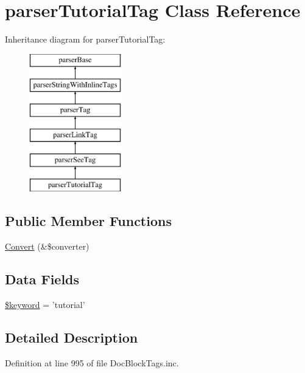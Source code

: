 \hypertarget{classparser_tutorial_tag}{\section{parser\-Tutorial\-Tag \-Class \-Reference}
\label{classparser_tutorial_tag}
}
\-Inheritance diagram for parser\-Tutorial\-Tag\-:\begin{figure}[H]
\begin{center}
\leavevmode
\includegraphics[height=6.000000cm]{classparser_tutorial_tag}
\end{center}
\end{figure}
\subsection*{\-Public \-Member \-Functions}
\begin{DoxyCompactItemize}
\item 
\hyperlink{classparser_tutorial_tag_a31e57fd66b58b300f8a489aa1b9431f6}{\-Convert} (\&\$converter)
\end{DoxyCompactItemize}
\subsection*{\-Data \-Fields}
\begin{DoxyCompactItemize}
\item 
\hyperlink{classparser_tutorial_tag_a4a925d6b38bcf3957c713a7d3dc7da1f}{\$keyword} = 'tutorial'
\end{DoxyCompactItemize}


\subsection{\-Detailed \-Description}


\-Definition at line 995 of file \-Doc\-Block\-Tags.\-inc.



